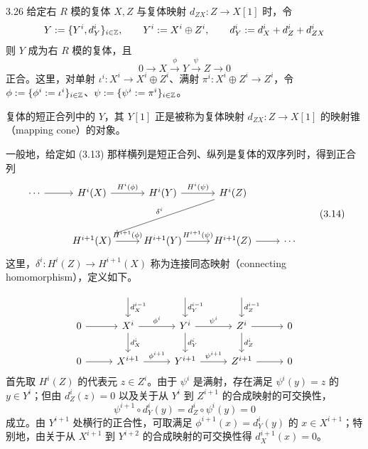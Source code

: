 \begin{proposition}{3.26}
给定右 $R$ 模的复体 $X,Z$ 与复体映射 $d_{ZX}\colon Z\to X[1]$ 时，令
\[
Y:=\{Y^i,d_Y^i\}_{i\in\mathbb{Z}},\qquad Y^i:=X^i\oplus Z^i,\qquad d_Y^i:=d_X^i+d_Z^i+d_{ZX}^i
\]
则 $Y$ 成为右 $R$ 模的复体，且
\[
0\to X\xrightarrow{\phi}Y\xrightarrow{\psi}Z\to 0
\]
正合。这里，对单射 $\iota^i\colon X^i\to X^i\oplus Z^i$、满射 $\pi^i\colon X^i\oplus Z^i\to Z^i$，令 $\phi:=\{\phi^i:=\iota^i\}_{i\in\mathbb{Z}}$、$\psi:=\{\psi^i:=\pi^i\}_{i\in\mathbb{Z}}$。
\end{proposition}


复体的短正合列中的 $Y$，其 $Y[1]$ 正是被称为复体映射 $d_{ZX}\colon Z\to X[1]$ 的映射锥（mapping cone）的对象。

一般地，给定如 (3.13) 那样横列是短正合列、纵列是复体的双序列时，得到正合列
\begin{equation}
\begin{tikzcd}[row sep=3.0em, column sep=2.4em]
\cdots \arrow[r] & H^i(X) \arrow[r,"H^i(\phi)"] & H^i(Y) \arrow[r,"H^i(\psi)"] & H^i(Z) \arrow[dll,"\delta^i"'] \\
& H^{i+1}(X) \arrow[r,"H^{i+1}(\phi)"] & H^{i+1}(Y) \arrow[r,"H^{i+1}(\psi)"] & H^{i+1}(Z) \arrow[r] & \cdots
\end{tikzcd} \tag{3.14}
\end{equation}
这里，$\delta^i\colon H^i(Z)\to H^{i+1}(X)$ 称为连接同态映射（connecting homomorphism），定义如下。
\[
\begin{tikzcd}[row sep=2.0em, column sep=2.7em]
& {} \arrow[d,"d_X^{i-1}"] & {} \arrow[d,"d_Y^{i-1}"] & {} \arrow[d,"d_Z^{i-1}"] & \\
0 \arrow[r] & X^i \arrow[r,"\phi^i"] \arrow[d,"d_X^i"] & Y^i \arrow[r,"\psi^i"] \arrow[d,"d_Y^i"] & Z^i \arrow[r] \arrow[d,"d_Z^i"] & 0 \\
0 \arrow[r] & X^{i+1} \arrow[r,"\phi^{i+1}"] & Y^{i+1} \arrow[r,"\psi^{i+1}"] & Z^{i+1} \arrow[r] & 0
\end{tikzcd}
\]
首先取 $H^i(Z)$ 的代表元 $z\in Z^i$。由于 $\psi^i$ 是满射，存在满足 $\psi^i(y)=z$ 的 $y\in Y^i$；但由 $d_Z^i(z)=0$ 以及关于从 $Y^i$ 到 $Z^{i+1}$ 的合成映射的可交换性，
\[
\psi^{i+1}\circ d_Y^i(y)=d_Z^i\circ\psi^i(y)=0
\]
成立。由 $Y^{i+1}$ 处横行的正合性，可取满足 $\phi^{i+1}(x)=d_Y^i(y)$ 的 $x\in X^{i+1}$；特别地，由关于从 $X^{i+1}$ 到 $Y^{i+2}$ 的合成映射的可交换性得 $d_X^{i+1}(x)=0$。

